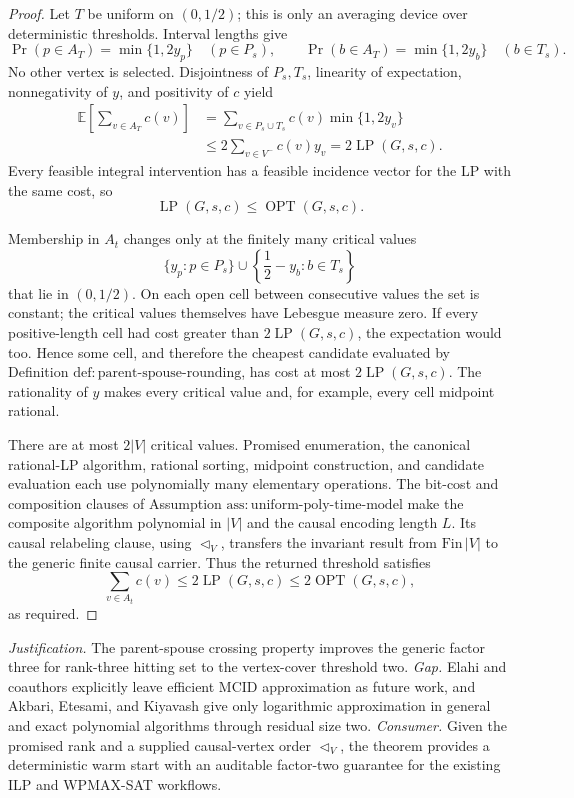 \documentclass{article}
\begin{document}
\begin{proof}
Let \(T\) be uniform on \((0,1/2)\); this is only an averaging device over
deterministic thresholds.  Interval lengths give
\[
 \Pr(p\in A_T)=\min\{1,2y_p\}\quad(p\in P_s),
 \qquad
 \Pr(b\in A_T)=\min\{1,2y_b\}\quad(b\in T_s).
\]
No other vertex is selected.  Disjointness of \(P_s,T_s\), linearity of
expectation, nonnegativity of \(y\), and positivity of \(c\) yield
\[
 \begin{aligned}
 \mathbb E\!\left[\sum_{v\in A_T}c(v)\right]
 &=\sum_{v\in P_s\cup T_s}c(v)\min\{1,2y_v\}\\
 &\leq2\sum_{v\in V^{-}}c(v)y_v
 =2\operatorname{LP}(G,s,c).
 \end{aligned}
\]
Every feasible integral intervention has a feasible incidence vector for
the LP with the same cost, so
\[
 \operatorname{LP}(G,s,c)\leq\operatorname{OPT}(G,s,c).
\]

Membership in \(A_t\) changes only at the finitely many critical values
\[
 \{y_p:p\in P_s\}\cup
 \left\{\frac12-y_b:b\in T_s\right\}
\]
that lie in \((0,1/2)\).  On each open cell between consecutive values the
set is constant; the critical values themselves have Lebesgue measure zero.
If every positive-length cell had cost greater than
\(2\operatorname{LP}(G,s,c)\), the expectation would too.  Hence some
cell, and therefore the cheapest candidate evaluated by Definition
\(\mathrm{def{:}parent\mbox{-}spouse\mbox{-}rounding}\), has cost at most
\(2\operatorname{LP}(G,s,c)\).  The rationality of \(y\) makes every
critical value and, for example, every cell midpoint rational.

There are at most \(2|V|\) critical values.  Promised enumeration, the
canonical rational-LP algorithm, rational sorting, midpoint construction,
and candidate evaluation each use polynomially many elementary operations.
The bit-cost and composition clauses of Assumption
\(\mathrm{ass{:}uniform\mbox{-}poly\mbox{-}time\mbox{-}model}\) make the
composite algorithm polynomial in \(|V|\) and the causal encoding length
\(L\).  Its causal relabeling clause, using \(\triangleleft_V\), transfers
the invariant result from \(\mathrm{Fin}\,|V|\) to the generic finite
causal carrier.  Thus the returned threshold satisfies
\[
 \sum_{v\in A_t}c(v)
 \leq2\operatorname{LP}(G,s,c)
 \leq2\operatorname{OPT}(G,s,c),
\]
as required.
\end{proof}
\par\smallskip\noindent \textit{Justification.} The parent-spouse crossing property improves the generic factor three for rank-three hitting set to the vertex-cover threshold two. \textit{Gap.} Elahi and coauthors explicitly leave efficient MCID approximation as future work, and Akbari, Etesami, and Kiyavash give only logarithmic approximation in general and exact polynomial algorithms through residual size two. \textit{Consumer.} Given the promised rank and a supplied causal-vertex order \(\triangleleft_V\), the theorem provides a deterministic warm start with an auditable factor-two guarantee for the existing ILP and WPMAX-SAT workflows.
\end{document}
